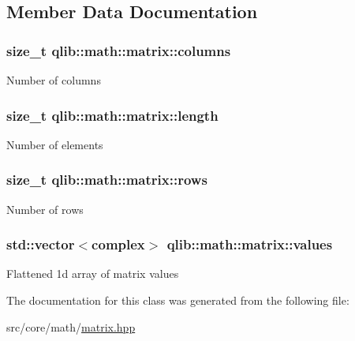 \subsection{Member Data Documentation}
\subsubsection[{\texorpdfstring{columns}{columns}}]{\setlength{\rightskip}{0pt plus 5cm}size\+\_\+t qlib\+::math\+::matrix\+::columns\hspace{0.3cm}{\ttfamily [private]}}\hypertarget{classqlib_1_1math_1_1matrix_ad3c2dd80c600d7bf37ae5bbdf5f056b8}{}\label{classqlib_1_1math_1_1matrix_ad3c2dd80c600d7bf37ae5bbdf5f056b8}
Number of columns 
\subsubsection[{\texorpdfstring{length}{length}}]{\setlength{\rightskip}{0pt plus 5cm}size\+\_\+t qlib\+::math\+::matrix\+::length\hspace{0.3cm}{\ttfamily [private]}}\hypertarget{classqlib_1_1math_1_1matrix_aef00292f85054708922acef6b7744a40}{}\label{classqlib_1_1math_1_1matrix_aef00292f85054708922acef6b7744a40}
Number of elements 
\subsubsection[{\texorpdfstring{rows}{rows}}]{\setlength{\rightskip}{0pt plus 5cm}size\+\_\+t qlib\+::math\+::matrix\+::rows\hspace{0.3cm}{\ttfamily [private]}}\hypertarget{classqlib_1_1math_1_1matrix_af29b6ea4316eb972bbdc55da6e54dbb3}{}\label{classqlib_1_1math_1_1matrix_af29b6ea4316eb972bbdc55da6e54dbb3}
Number of rows 
\subsubsection[{\texorpdfstring{values}{values}}]{\setlength{\rightskip}{0pt plus 5cm}std\+::vector$<${\bf complex}$>$ qlib\+::math\+::matrix\+::values\hspace{0.3cm}{\ttfamily [private]}}\hypertarget{classqlib_1_1math_1_1matrix_ad764d65375ba1e50381f640bdc181c0b}{}\label{classqlib_1_1math_1_1matrix_ad764d65375ba1e50381f640bdc181c0b}
Flattened 1d array of matrix values 

The documentation for this class was generated from the following file\+:\begin{DoxyCompactItemize}
\item 
src/core/math/\hyperlink{matrix_8hpp}{matrix.\+hpp}\end{DoxyCompactItemize}
